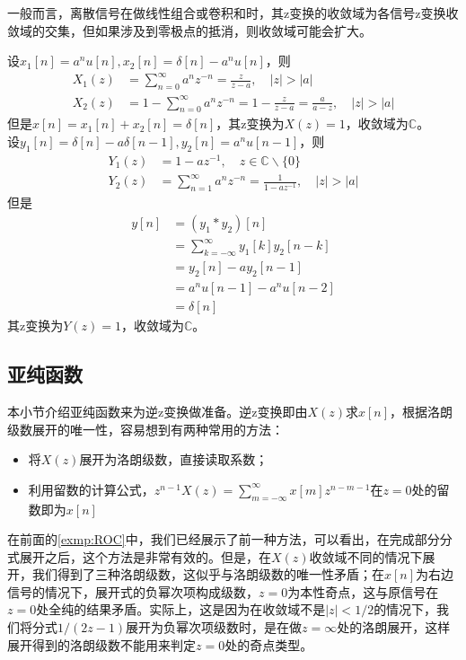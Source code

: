 一般而言，离散信号在做线性组合或卷积和时，其z变换的收敛域为各信号z变换收敛域的交集，但如果涉及到零极点的抵消，则收敛域可能会扩大。
\begin{example}[收敛域的扩张]
    设$x_1[n]=a^{n}u[n],x_2[n]=\delta[n]-a^{n}u[n]$，则
    \begin{align*}
        X_1(z)&=\sum_{n=0}^{\infty}a^{n}z^{-n}=\frac{z}{z-a},\quad |z|>|a|\\
        X_2(z)&=1-\sum_{n=0}^{\infty}a^{n}z^{-n}=1-\frac{z}{z-a}=\frac{a}{a-z},\quad |z|>|a|
    \end{align*}
    但是$x[n]=x_1[n]+x_2[n]=\delta[n]$，其z变换为$X(z)=1$，收敛域为$\mathbb{C}$。\\
    设$y_1[n]=\delta[n]-a\delta[n-1],y_2[n]=a^{n}u[n-1]$，则
    \begin{align*}
        Y_1(z)&=1-a z^{-1},\quad z\in\mathbb{C}\backslash\{0\}\\
        Y_2(z)&=\sum_{n=1}^{\infty}a^{n}z^{-n}=\frac{1}{1-a z^{-1}},\quad |z|>|a|
    \end{align*}
    但是\begin{align*}
        y[n]&=\left(y_1*y_2\right)[n]\\
        &=\sum_{k=-\infty}^{\infty}y_1[k]y_2[n-k]\\
        &=y_2[n]-a y_2[n-1]\\
        &=a^{n}u[n-1]-a^{n}u[n-2]\\
        &=\delta[n]
    \end{align*}
    其z变换为$Y(z)=1$，收敛域为$\mathbb{C}$。
\end{example}

\subsection{亚纯函数}\label{sub:meromorphic_function}

本小节介绍亚纯函数来为逆z变换做准备。逆z变换即由$X(z)$求$x[n]$，根据洛朗级数展开的唯一性，容易想到有两种常用的方法：
\begin{itemize}
    \item 将$X(z)$展开为洛朗级数，直接读取系数；
    \item 利用留数的计算公式，$z^{n-1} X(z)=\sum_{m=-\infty}^{\infty} x[m] z^{n-m-1}$在$z=0$处的留数即为$x[n]$
\end{itemize}

在前面的\cref{exmp:ROC}中，我们已经展示了前一种方法，可以看出，在完成部分分式展开之后，这个方法是非常有效的。但是，在$X(z)$收敛域不同的情况下展开，我们得到了三种洛朗级数，这似乎与洛朗级数的唯一性矛盾；在$x[n]$为右边信号的情况下，展开式的负幂次项构成级数，$z=0$为本性奇点，这与原信号在$z=0$处全纯的结果矛盾。实际上，这是因为在收敛域不是$|z|<1/2$的情况下，我们将分式$1/(2z-1)$展开为负幂次项级数时，是在做$z=\infty$处的洛朗展开，这样展开得到的洛朗级数不能用来判定$z=0$处的奇点类型。

